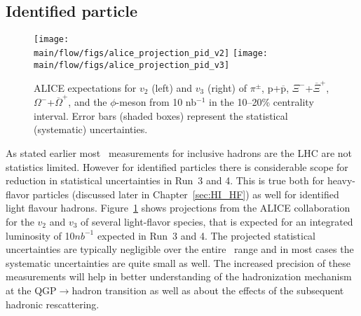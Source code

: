 \subsection{Identified particle \vn}\label{sec:identified_particle_vn}


\begin{figure}[!htb]
\begin{center}
\texttt{[image: \\main/flow/figs/alice\_projection\_pid\_v2]}
\texttt{[image: \\main/flow/figs/alice\_projection\_pid\_v3]}
\caption{ALICE expectations for $v_2$ (left) and $v_3$ (right) of $\pi^\pm$, $\mathrm{p}$+$\overline{\mathrm{p}}$, $\Xi^-$+$\overline{\Xi}^+$, $\Omega^-$+$\overline{\Omega}^+$, and the $\phi$-meson from 10 nb$^{-1}$ in the 10--20\% centrality interval. Error bars (shaded boxes) represent the statistical (systematic) uncertainties.}
\label{fig:alice_vn}
\end{center}
\end{figure}

As stated earlier most \vn\ measurements for inclusive hadrons are the LHC 
  are not statistics limited.
However for identified particles there is considerable scope for reduction 
  in statistical uncertainties in Run~3 and 4.
This is true both for heavy-flavor particles (discussed later in Chapter~\ref{sec:HI_HF})
  as well for identified light flavour hadrons.
Figure~\ref{fig:alice_vn} shows projections from the ALICE collaboration for 
  the $v_2$ and $v_3$ of several light-flavor species, that is expected for 
	an integrated luminosity of 10$nb^{-1}$ expected in Run~3 and 4. 
The projected statistical uncertainties are typically negligible over the 
  entire \pt\ range and in most cases the systematic uncertainties are 
	quite small as well.
The increased precision of these measurements will help in better understanding 
  of the hadronization mechanism at the QGP$\rightarrow$hadron transition
	as well as about the effects of the subsequent hadronic rescattering.



